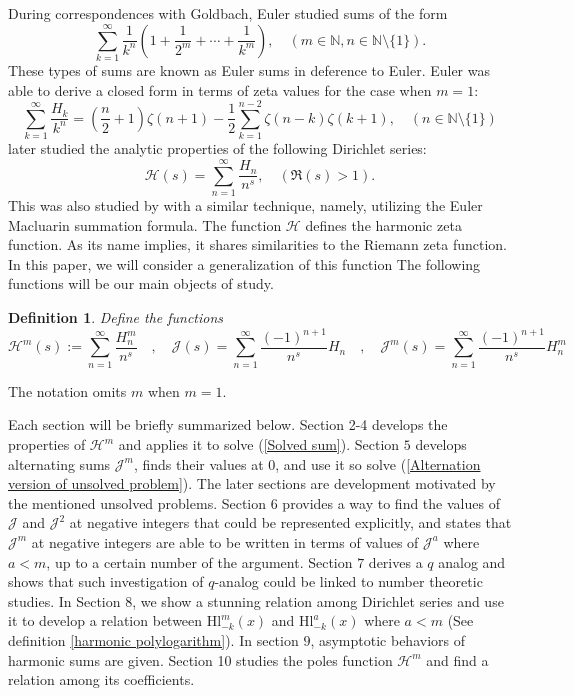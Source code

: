 \documentclass{article}
\newcommand{\pHz}[2]{\mathcal{H}^{#1}(#2)}
\newcommand{\powerharmonicetafunction}[2]{{\mathcal{J}}^{#1}(#2)}
\newtheorem{definition}{Definition}%
\begin{document}
During correspondences with Goldbach, Euler studied sums of the form
$$\sum_{k=1}^\infty \frac{1}{k^n}\left(1 + \frac{1}{2^m} + \cdots + \frac{1}{k^m}\right), \quad (m \in \mathbb{N}, n \in \mathbb{N} \setminus\{1\}).$$
These types of sums are known as Euler sums in deference to Euler. Euler was able to derive a closed form in terms of zeta values for the case when $m=1$:
$$\sum_{k=1}^\infty \frac{H_k}{k^n} = \left(\frac{n}{2} + 1\right)\zeta(n+1) - \frac{1}{2}\sum_{k=1}^{n-2} \zeta(n-k)\zeta(k+1), \quad (n \in \mathbb{N}\setminus\{1\})$$
 \cite{apostol1984dirichlet} later studied the analytic properties of the following Dirichlet series:
$$\mathcal{H}(s) = \sum_{n=1}^\infty \frac{H_n}{n^s}, \quad (\Re(s) > 1).$$
This was also studied by \cite{matsuoka1982values} with a similar technique, namely, utilizing the Euler Macluarin summation formula. The function $\mathcal{H}$ defines the harmonic zeta function. As its name implies, it shares similarities to the Riemann zeta function. In this paper, we will consider a generalization of this function
 The following functions will be our main objects of study.
\begin{definition}
    Define the functions 
    \[ \pHz{m}{s}:=\sum_{n=1}^{\infty} \frac{H^m_n}{n^s}\quad, \quad 
          \mathcal{J}(s)=\sum_{n=1}^{\infty} \frac{(-1)^{n+1}}{n^s}H_n \quad ,\quad\powerharmonicetafunction{m}{s}=\sum_{n=1}^{\infty} \frac{(-1)^{n+1}}{n^s}H_n^m 
    \]
\end{definition} The notation omits $m$ when $m=1$. \par
Each section will be briefly summarized below. Section 2-4 develops the properties of $\mathcal{H}^m$ and applies it to solve (\ref{Solved sum}). Section $5$ develops alternating sums $\mathcal{J}^m$, finds their values at $0$, and use it so solve (\ref{Alternation version of unsolved problem}). The later sections are development motivated by the mentioned unsolved problems. Section $6$ provides a way to find the values of $\mathcal{J}$ and $\mathcal{J}^2$ at negative integers that could be represented explicitly, and states that $\mathcal{J}^m$ at negative integers are able to be written in terms of values of $\mathcal{J}^a$ where $a<m$, up to a certain number of the argument. Section $7$ derives a $q$ analog and shows that such investigation of $q$-analog could be linked to number theoretic studies. In Section $8$, we show a stunning relation among Dirichlet series and use it to develop a relation between $\mathrm{Hl}_{-k}^m(x)$ and $\mathrm{Hl}_{-k}^a(x)$ where $a<m$ (See definition \ref{harmonic polylogarithm}). In section $9$, asymptotic behaviors of harmonic sums are given. Section 10 studies the poles function $\mathcal{H}^m$ and find a relation among its coefficients. 
\end{document}
